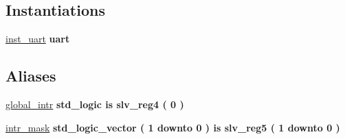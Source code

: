 \subsection*{Instantiations}
 \begin{DoxyCompactItemize}
\item 
\mbox{\label{classUART__v1__0__S00__AXI_1_1arch__imp_ac10de3465f1df3e0e99a80a6db750f9f}} 
\hyperlink{classUART__v1__0__S00__AXI_1_1arch__imp_ac10de3465f1df3e0e99a80a6db750f9f}{inst\+\_\+uart}  {\bfseries uart}   
\end{DoxyCompactItemize}
\subsection*{Aliases}
 \begin{DoxyCompactItemize}
\item 
\mbox{\label{classUART__v1__0__S00__AXI_1_1arch__imp_a653b661ef40f610cbcf0bba644ac034c}} 
\hyperlink{classUART__v1__0__S00__AXI_1_1arch__imp_a653b661ef40f610cbcf0bba644ac034c}{global\+\_\+intr}  {\bfseries {\bfseries \textcolor{vhdlchar}{std\+\_\+logic}\textcolor{vhdlchar}{ }\textcolor{vhdlchar}{ }\textcolor{vhdlchar}{ }\textcolor{vhdlchar}{is}\textcolor{vhdlchar}{ }\textcolor{vhdlchar}{slv\+\_\+reg4}\textcolor{vhdlchar}{ }\textcolor{vhdlchar}{(}\textcolor{vhdlchar}{ }\textcolor{vhdlchar}{ } \textcolor{vhdldigit}{0} \textcolor{vhdlchar}{ }\textcolor{vhdlchar}{)}\textcolor{vhdlchar}{ }}} {\bfseries \textcolor{vhdlchar}{ }} 
\item 
\mbox{\label{classUART__v1__0__S00__AXI_1_1arch__imp_a0cfc6c234ce00413175fbbdc0e556f1d}} 
\hyperlink{classUART__v1__0__S00__AXI_1_1arch__imp_a0cfc6c234ce00413175fbbdc0e556f1d}{intr\+\_\+mask}  {\bfseries {\bfseries \textcolor{vhdlchar}{std\+\_\+logic\+\_\+vector}\textcolor{vhdlchar}{ }\textcolor{vhdlchar}{(}\textcolor{vhdlchar}{ }\textcolor{vhdlchar}{ } \textcolor{vhdldigit}{1} \textcolor{vhdlchar}{ }\textcolor{vhdlchar}{downto}\textcolor{vhdlchar}{ }\textcolor{vhdlchar}{ } \textcolor{vhdldigit}{0} \textcolor{vhdlchar}{ }\textcolor{vhdlchar}{)}\textcolor{vhdlchar}{ }\textcolor{vhdlchar}{ }\textcolor{vhdlchar}{ }\textcolor{vhdlchar}{ }\textcolor{vhdlchar}{is}\textcolor{vhdlchar}{ }\textcolor{vhdlchar}{slv\+\_\+reg5}\textcolor{vhdlchar}{ }\textcolor{vhdlchar}{(}\textcolor{vhdlchar}{ }\textcolor{vhdlchar}{ } \textcolor{vhdldigit}{1} \textcolor{vhdlchar}{ }\textcolor{vhdlchar}{downto}\textcolor{vhdlchar}{ }\textcolor{vhdlchar}{ } \textcolor{vhdldigit}{0} \textcolor{vhdlchar}{ }\textcolor{vhdlchar}{)}\textcolor{vhdlchar}{ }}} {\bfseries \textcolor{vhdlchar}{ }} 

\end{DoxyCompactItemize}
